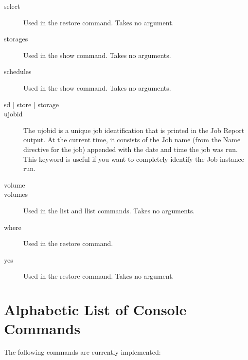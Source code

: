 \begin{description}
\item [select]
  Used in the restore command. Takes no argument.
\item [storages]
  Used in the show command. Takes no arguments.
\item [schedules]
  Used in the show command. Takes no arguments.
\item [sd | store | storage]
\item [ujobid]
  The ujobid is a unique job identification that is printed
  in the Job Report output. At the current time, it consists
  of the Job name (from the Name directive for the job) appended
  with the date and time the job was run. This keyword is useful
  if you want to completely identify the Job instance run.
\item [volume]
\item [volumes]
  Used in the list and llist commands. Takes no arguments.
\item [where]
  Used in the restore command.
\item [yes]
  Used in the restore command. Takes no argument.
\end{description}

\label{list}
\section{Alphabetic List of Console Commands}

The following commands are currently implemented: 

